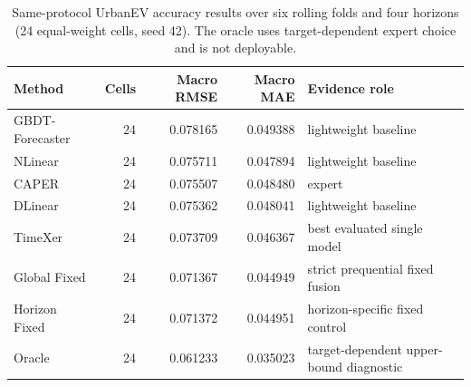 \begin{table}[t]
\centering
\caption{Same-protocol UrbanEV accuracy results over six rolling folds and four horizons (24 equal-weight cells, seed 42). The oracle uses target-dependent expert choice and is not deployable.}
\label{tab:accuracy}
\small
\begin{tabular}{lrrrl}
\toprule
Method & Cells & Macro RMSE & Macro MAE & Evidence role \\
\midrule
GBDT-Forecaster & 24 & 0.078165 & 0.049388 & lightweight baseline \\
NLinear & 24 & 0.075711 & 0.047894 & lightweight baseline \\
CAPER & 24 & 0.075507 & 0.048480 & expert \\
DLinear & 24 & 0.075362 & 0.048041 & lightweight baseline \\
TimeXer & 24 & 0.073709 & 0.046367 & best evaluated single model \\
Global Fixed & 24 & 0.071367 & 0.044949 & strict prequential fixed fusion \\
Horizon Fixed & 24 & 0.071372 & 0.044951 & horizon-specific fixed control \\
Oracle & 24 & 0.061233 & 0.035023 & target-dependent upper-bound diagnostic \\
\bottomrule
\end{tabular}
\end{table}
